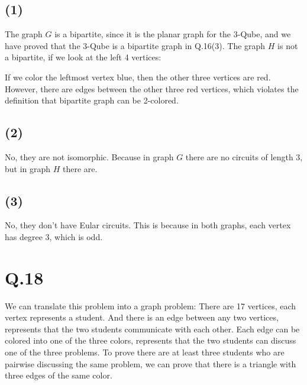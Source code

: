 \documentclass[a4paper,12pt]{article}
\begin{document}
\subsection*{(1)}

The graph $G$ is a bipartite, since it is the planar graph for the 3-Qube, and we have proved that the 3-Qube is a bipartite graph in Q.16(3).
The graph $H$ is not a bipartite, if we look at the left 4 vertices:
\begin{center}
\end{center}

If we color the leftmost vertex blue, then the other three vertices are red.
However, there are edges between the other three red vertices, which violates the definition that bipartite graph can be 2-colored.

\subsection*{(2)}

No, they are not isomorphic.
Because in graph $G$ there are no circuits of length 3, but in graph $H$ there are.

\subsection*{(3)}

No, they don't have Eular circuits.
This is because in both graphs, each vertex has degree 3, which is odd.

\section*{Q.18}

We can translate this problem into a graph problem:
There are 17 vertices, each vertex represents a student.
And there is an edge between any two vertices, represents that the two students communicate with each other.
Each edge can be colored into one of the three colors, represents that the two students can discuss one of the three problems.
To prove there are at least three students who are pairwise discussing the same problem, we can prove that there is a triangle with three edges of the same color.
\end{document}

